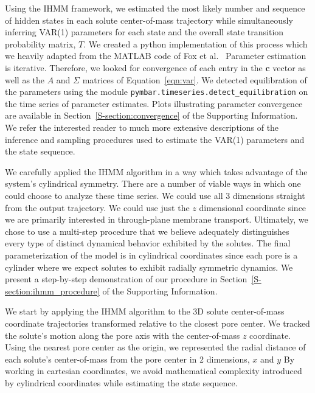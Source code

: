 \documentclass{article}
\begin{document}
  
  Using the IHMM framework, we estimated the most likely number and sequence of hidden
  states in each solute center-of-mass trajectory while simultaneously inferring VAR(1)
  parameters for each state and the overall state transition probability matrix, $T$.
  We created a python implementation of this process which we heavily adapted from
  the MATLAB code of Fox et al.~\cite{fox_sticky_2007} Parameter estimation is iterative. 
  Therefore, we looked for convergence of each entry in the $\mathbf{c}$ vector as well
  as the $A$ and $\Sigma$ matrices of Equation~\ref{eqn:var}. We detected equilibration 
  of the parameters using the module \texttt{pymbar.timeseries.detect\_equilibration} on
  the time series of parameter estimates. Plots illustrating parameter convergence are 
  available in Section~\ref{S-section:convergence} of the Supporting Information. We refer the interested reader to 
  much more extensive descriptions of the inference and sampling procedures used to 
  estimate the VAR(1) parameters and the state sequence. ~\cite{beal_infinite_2002,teh_hierarchical_2006,van_gael_beam_2008,fox_nonparametric_2009,fox_bayesian_2010}

  We carefully applied the IHMM algorithm in a way which takes advantage of the
  system's cylindrical symmetry. There are a number of viable ways in which one 
  could choose to analyze these time series. We could use all 3 dimensions straight
  from the output trajectory. We could use just the $z$ dimensional coordinate 
  since we are primarily interested in through-plane membrane transport. Ultimately, 
  we chose to use a multi-step procedure that we believe adequately distinguishes 
  every type of distinct dynamical behavior exhibited by the solutes. The final
  parameterization of the model is in cylindrical coordinates since each pore is a
  cylinder where we expect solutes to exhibit radially symmetric dynamics. We 
  present a step-by-step demonstration of our procedure in Section~\ref{S-section:ihmm_procedure}
  of the Supporting Information.
  
  We start by applying the IHMM algorithm to the 3D solute center-of-mass coordinate 
  trajectories transformed relative to the closest pore center. We tracked the solute's
  motion along the pore axis with the center-of-mass $z$ coordinate. Using the nearest
  pore center as the origin, we represented the radial distance of each solute's 
  center-of-mass from the pore center in 2 dimensions, $x$ and $y$ 
  By working in cartesian coordinates, we avoid
  mathematical complexity introduced by cylindrical coordinates while estimating the 
  state sequence.
\end{document}
